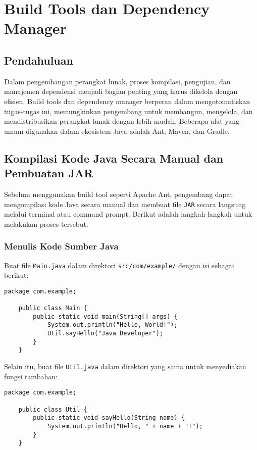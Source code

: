 \chapter{Build Tools dan Dependency Manager}

\section{Pendahuluan}
Dalam pengembangan perangkat lunak, proses kompilasi, pengujian, dan manajemen dependensi menjadi bagian penting yang harus dikelola dengan efisien. Build tools dan dependency manager berperan dalam mengotomatiskan tugas-tugas ini, memungkinkan pengembang untuk membangun, mengelola, dan mendistribusikan perangkat lunak dengan lebih mudah. Beberapa alat yang umum digunakan dalam ekosistem Java adalah Ant, Maven, dan Gradle.


\section{Kompilasi Kode Java Secara Manual dan Pembuatan JAR}
Sebelum menggunakan build tool seperti Apache Ant, pengembang dapat mengompilasi kode Java secara manual dan membuat file \texttt{JAR} secara langsung melalui terminal atau command prompt. Berikut adalah langkah-langkah untuk melakukan proses tersebut.

\subsection{Menulis Kode Sumber Java}
Buat file \texttt{Main.java} dalam direktori \texttt{src/com/example/} dengan isi sebagai berikut:

\begin{lstlisting}[style=JavaStyle]
	package com.example;
	
	public class Main {
		public static void main(String[] args) {
			System.out.println("Hello, World!");
			Util.sayHello("Java Developer");
		}
	}
\end{lstlisting}

Selain itu, buat file \texttt{Util.java} dalam direktori yang sama untuk menyediakan fungsi tambahan:

\begin{lstlisting}[style=JavaStyle]
	package com.example;
	
	public class Util {
		public static void sayHello(String name) {
			System.out.println("Hello, " + name + "!");
		}
	}
\end{lstlisting}

